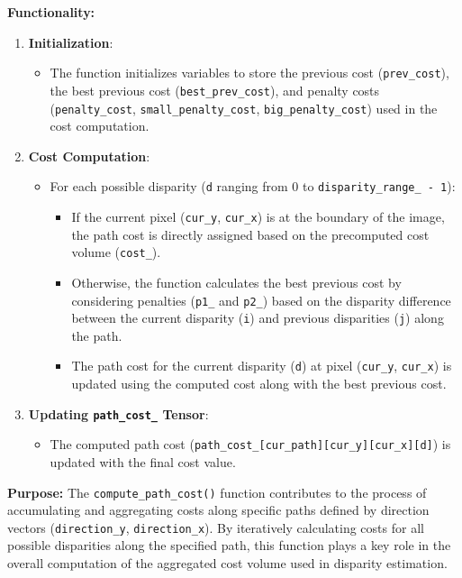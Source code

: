 \documentclass{article}
\begin{document}
\textbf{Functionality:}
\begin{enumerate}
    \item \textbf{Initialization}:
        \begin{itemize}
            \item The function initializes variables to store the previous cost (\texttt{prev\_cost}), the best previous cost (\texttt{best\_prev\_cost}), and penalty costs (\texttt{penalty\_cost}, \texttt{small\_penalty\_cost}, \texttt{big\_penalty\_cost}) used in the cost computation.
        \end{itemize}
    
    \item \textbf{Cost Computation}:
        \begin{itemize}
            \item For each possible disparity (\texttt{d} ranging from 0 to \texttt{disparity\_range\_ - 1}):
                \begin{itemize}
                    \item If the current pixel (\texttt{cur\_y}, \texttt{cur\_x}) is at the boundary of the image, the path cost is directly assigned based on the precomputed cost volume (\texttt{cost\_}).
                    \item Otherwise, the function calculates the best previous cost by considering penalties (\texttt{p1\_} and \texttt{p2\_}) based on the disparity difference between the current disparity (\texttt{i}) and previous disparities (\texttt{j}) along the path.
                    \item The path cost for the current disparity (\texttt{d}) at pixel (\texttt{cur\_y}, \texttt{cur\_x}) is updated using the computed cost along with the best previous cost.
                \end{itemize}
        \end{itemize}
    
    \item \textbf{Updating \texttt{path\_cost\_} Tensor}:
        \begin{itemize}
            \item The computed path cost (\texttt{path\_cost\_[cur\_path][cur\_y][cur\_x][d]}) is updated with the final cost value.
        \end{itemize}
\end{enumerate}

\textbf{Purpose:}
The \texttt{compute\_path\_cost()} function contributes to the process of accumulating and aggregating costs along specific paths defined by direction vectors (\texttt{direction\_y}, \texttt{direction\_x}). By iteratively calculating costs for all possible disparities along the specified path, this function plays a key role in the overall computation of the aggregated cost volume used in disparity estimation.
\end{document}
